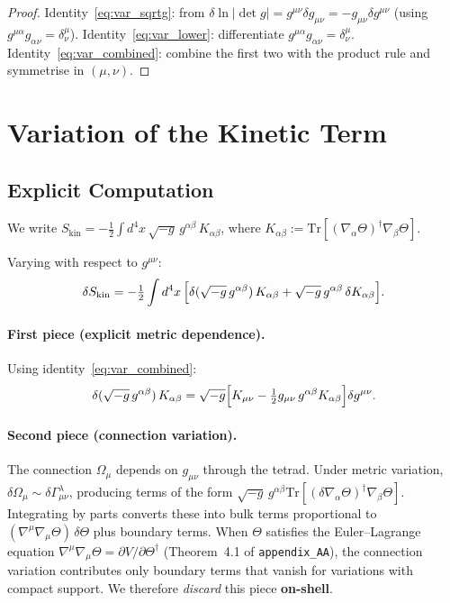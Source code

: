 \documentclass[12pt]{article}
\newcommand{\Tr}{\mathrm{Tr}}
\begin{document}
\begin{proof}
  Identity~\eqref{eq:var_sqrtg}: from $\delta\ln|\det g| = g^{\mu\nu}\delta g_{\mu\nu}
  = -g_{\mu\nu}\delta g^{\mu\nu}$ (using $g^{\mu\alpha}g_{\alpha\nu}=\delta^\mu_\nu$).
  Identity~\eqref{eq:var_lower}: differentiate $g^{\mu\alpha}g_{\alpha\nu}=\delta^\mu_\nu$.
  Identity~\eqref{eq:var_combined}: combine the first two with the product rule
  and symmetrise in $(\mu,\nu)$.
\end{proof}

\section{Variation of the Kinetic Term}
\label{sec:kin}

\subsection{Explicit Computation}

We write $S_{\mathrm{kin}} = -\tfrac{1}{2}\int d^4x\,
\sqrt{-g}\,g^{\alpha\beta}\,K_{\alpha\beta}$, where
$K_{\alpha\beta} := \Tr[(\nabla_\alpha\Theta)^\dagger\nabla_\beta\Theta]$.

Varying with respect to $g^{\mu\nu}$:
\begin{equation}
  \delta S_{\mathrm{kin}}
  = -\tfrac{1}{2}\int d^4x\,\Bigl[
      \delta(\sqrt{-g}\,g^{\alpha\beta})\,K_{\alpha\beta}
    + \sqrt{-g}\,g^{\alpha\beta}\,\delta K_{\alpha\beta}
    \Bigr].
\end{equation}

\paragraph{First piece (explicit metric dependence).}
Using identity~\eqref{eq:var_combined}:
\begin{equation}
  \delta(\sqrt{-g}\,g^{\alpha\beta})\,K_{\alpha\beta}
  = \sqrt{-g}\Bigl[K_{\mu\nu} - \tfrac{1}{2}g_{\mu\nu}\,g^{\alpha\beta}K_{\alpha\beta}
    \Bigr]\delta g^{\mu\nu}.
\end{equation}

\paragraph{Second piece (connection variation).}
The connection $\Omega_\mu$ depends on $g_{\mu\nu}$ through the tetrad.
Under metric variation, $\delta\Omega_\mu \sim \delta\Gamma^\lambda_{\mu\nu}$,
producing terms of the form
$\sqrt{-g}\,g^{\alpha\beta}\Tr[(\delta\nabla_\alpha\Theta)^\dagger\nabla_\beta\Theta]$.
Integrating by parts converts these into bulk terms proportional to
$(\nabla^\mu\nabla_\mu\Theta)\,\delta\Theta$ plus boundary terms.
When $\Theta$ satisfies the Euler--Lagrange equation
$\nabla^\mu\nabla_\mu\Theta = \partial V/\partial\Theta^\dagger$
(Theorem~4.1 of \texttt{appendix\_AA}), the connection variation contributes
only boundary terms that vanish for variations with compact support.
We therefore \emph{discard} this piece \textbf{on-shell}.
\end{document}
